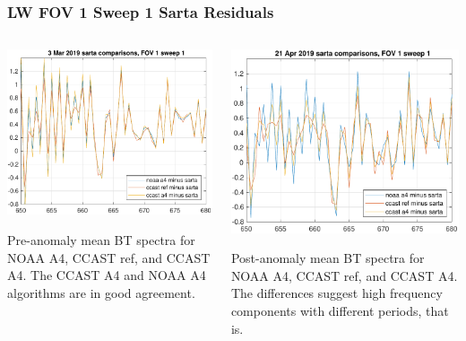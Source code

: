 \documentclass[10pt]{beamer}
\begin{document}
\begin{frame}
\frametitle{LW FOV 1 Sweep 1 Sarta Residuals}
\begin{columns}[t]
\begin{column}{0.5\textwidth}
  \begin{centering}
  \includegraphics[width=\textwidth]{figures/LW_pre_fail_sarta_fov1_sd1.pdf}
  \end{centering}\vspace{3mm}
  Pre-anomaly mean BT spectra for NOAA A4, CCAST ref, and CCAST A4.
  The CCAST A4 and NOAA A4 algorithms are in good agreement.

\end{column}
\begin{column}{0.5\textwidth}  
  \begin{centering}
  \includegraphics[width=\textwidth]{figures/LW_post_fail_sarta_fov1_sd1.pdf}
  \end{centering}\vspace{3mm}
  Post-anomaly mean BT spectra for NOAA A4, CCAST ref, and CCAST A4.
  The differences suggest high frequency components with different
  periods, that is.


\end{column}
\end{columns}
\end{frame}
\end{document}
